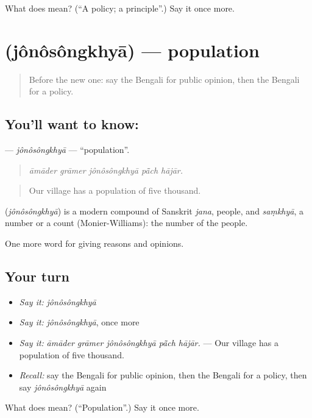 \begin{tcolorbox}[breakable,colback=teal!4,colframe=teal!35!black,title={Before you move on}]
What does  mean? (\textquotedblleft{}A policy; a principle\textquotedblright{}.) Say it once more.
\end{tcolorbox}
\section[\texorpdfstring{\bn{জনসংখ্যা} (jônôsôngkhyā)}{জনসংখ্যা (jônôsôngkhyā)}]{ (jônôsôngkhyā) — population}

\label{lesson:BN-C349-jonosongkhya}



\begin{quote}
Before the new one: say the Bengali for public opinion, then the Bengali for a policy.
\end{quote}

\subsection*{You'll want to know: }
\textbf{} — \emph{jônôsôngkhyā} — \textquotedblleft{}population\textquotedblright{}.

\begin{quote}
    
\end{quote}

\begin{quote}
\emph{āmāder grāmer jônôsôngkhyā pā̃ch hājār.}
\end{quote}

\begin{quote}
Our village has a population of five thousand.
\end{quote}

\begin{cousinweb}
\textbf{} (\emph{jônôsôngkhyā}) is a modern compound of Sanskrit \emph{jana}, people, and \emph{saṃkhyā}, a number or a count (Monier-Williams): the number of the people.
\end{cousinweb}

\begin{grammarlens}[title={What you've built}]
One more word for giving reasons and opinions.
\end{grammarlens}

\subsection*{Your turn}
\begin{itemize}
\raggedright
  \item \emph{Say it:} \emph{jônôsôngkhyā}
  \item \emph{Say it:} \emph{jônôsôngkhyā}, once more
  \item \emph{Say it:} \emph{āmāder grāmer jônôsôngkhyā pā̃ch hājār.} — Our village has a population of five thousand.
  \item \emph{Recall:} say the Bengali for public opinion, then the Bengali for a policy, then say \emph{jônôsôngkhyā} again
\end{itemize}

\begin{tcolorbox}[breakable,colback=teal!4,colframe=teal!35!black,title={Before you move on}]
What does  mean? (\textquotedblleft{}Population\textquotedblright{}.) Say it once more.
\end{tcolorbox}
